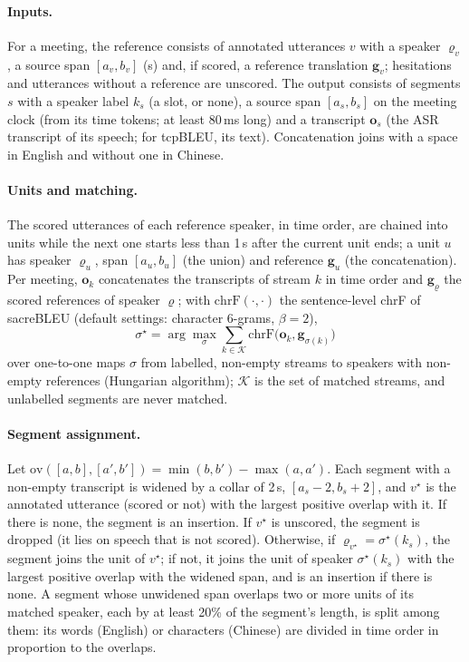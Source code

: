 \paragraph{Inputs.} For a meeting, the reference consists of annotated utterances $v$ with a speaker $\varrho_v$, a
source span $[a_v,b_v]$ (s) and, if scored, a reference translation $\bm{g}_v$; hesitations and utterances without a
reference are unscored. The output consists of segments $s$ with a speaker label $k_s$ (a slot, or none), a source
span $[a_s,b_s]$ on the meeting clock (from its time tokens; at least 80\,ms long) and a transcript $\bm{o}_s$ (the ASR
transcript of its speech; for tcpBLEU, its text). Concatenation joins with a space in English and without one in
Chinese.

\paragraph{Units and matching.} The scored utterances of each reference speaker, in time order, are chained into units
while the next one starts less than 1\,s after the current unit ends; a unit $u$ has speaker $\varrho_u$, span
$[a_u,b_u]$ (the union) and reference $\bm{g}_u$ (the concatenation). Per meeting, $\bm{o}_k$ concatenates the transcripts
of stream $k$ in time order and $\bm{g}_\varrho$ the scored references of speaker $\varrho$; with
$\mathrm{chrF}(\cdot,\cdot)$ the sentence-level chrF of sacreBLEU (default settings: character 6-grams, $\beta=2$),
\begin{equation}
\sigma^\star=\arg\max_{\sigma}\textstyle\sum_{k\in\mathcal{K}}\mathrm{chrF}\big(\bm{o}_k,\bm{g}_{\sigma(k)}\big)
\label{eq:sigma}
\end{equation}
over one-to-one maps $\sigma$ from labelled, non-empty streams to speakers with non-empty references (Hungarian
algorithm); $\mathcal{K}$ is the set of matched streams, and unlabelled segments are never matched.

\paragraph{Segment assignment.} Let $\mathrm{ov}([a,b],[a',b'])=\min(b,b')-\max(a,a')$. Each segment with a non-empty
transcript is widened by a collar of 2\,s, $[a_s-2,b_s+2]$, and $v^\star$ is the annotated utterance (scored or not) with
the largest positive overlap with it. If there is none, the segment is an insertion. If $v^\star$ is unscored, the
segment is dropped (it lies on speech that is not scored). Otherwise, if $\varrho_{v^\star}=\sigma^\star(k_s)$, the segment
joins the unit of $v^\star$; if not, it joins the unit of speaker $\sigma^\star(k_s)$ with the largest positive overlap
with the widened span, and is an insertion if there is none. A segment whose unwidened span overlaps two or more units of
its matched speaker, each by at least 20\% of the segment's length, is split among them: its words (English) or
characters (Chinese) are divided in time order in proportion to the overlaps.

